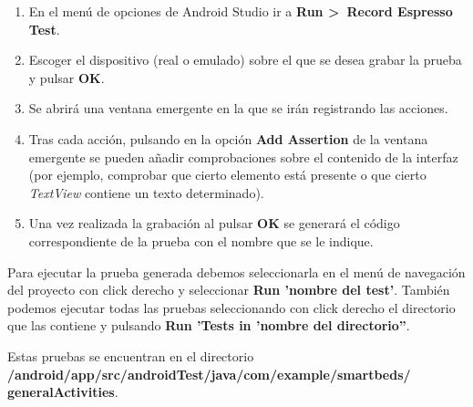 \begin{enumerate}
	\item En el menú de opciones de Android Studio ir a \textbf{Run >~Record Espresso Test}. 
	\item Escoger el dispositivo (real o emulado) sobre el que se desea grabar la prueba y pulsar \textbf{OK}. 
	\item Se abrirá una ventana emergente en la que se irán registrando las acciones. 
	\item Tras cada acción, pulsando en la opción \textbf{Add Assertion} de la ventana emergente se pueden añadir comprobaciones sobre el contenido de la interfaz (por ejemplo, comprobar que cierto elemento está presente o que cierto \textit{TextView} contiene un texto determinado). 
	\item Una vez realizada la grabación al pulsar \textbf{OK} se generará el código correspondiente de la prueba con el nombre que se le indique. 
\end{enumerate} 

Para ejecutar la prueba generada debemos seleccionarla en el menú de navegación del proyecto con click derecho y seleccionar \textbf{Run 'nombre del test'}. También podemos ejecutar todas las pruebas seleccionando con click derecho el directorio que las contiene y pulsando \textbf{Run 'Tests in 'nombre del directorio''}. 

Estas pruebas se encuentran en el directorio \\ \textbf{/android/app/src/androidTest/java/com/example/smartbeds/\\generalActivities}.

